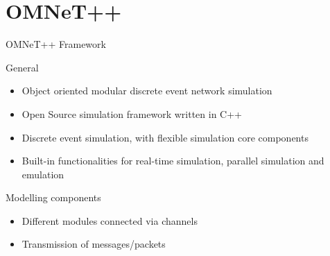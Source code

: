 \section{OMNeT++}

\begin{frame}{OMNeT++ Framework}
    \begin{block}{General}
        \begin{itemize}
            \item Object oriented modular discrete event network simulation
            \item Open Source simulation framework written in C++
            \item Discrete event simulation, with flexible simulation core components
            \item Built-in functionalities for real-time simulation, parallel simulation and emulation
        \end{itemize}
    \end{block}
    \begin{block}{Modelling components}
        \begin{itemize}
            \item Different modules connected via channels
            \item Transmission of messages/packets
        \end{itemize}
    \end{block}
\end{frame}